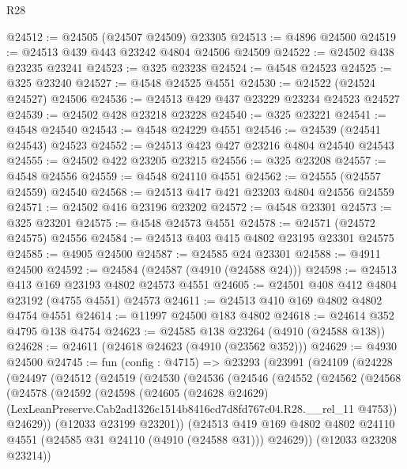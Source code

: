 \begin{lexlean}{R28}
\begin{coremodule}
@24512 := @24505 (@24507 @24509) @23305
@24513 := @4896 @24500
@24519 := @24513 @439 @443 @23242 @4804 @24506 @24509
@24522 := @24502 @438 @23235 @23241
@24523 := @325 @23238
@24524 := @4548 @24523
@24525 := @325 @23240
@24527 := @4548 @24525 @4551
@24530 := @24522 (@24524 @24527) @24506
@24536 := @24513 @429 @437 @23229 @23234 @24523 @24527
@24539 := @24502 @428 @23218 @23228
@24540 := @325 @23221
@24541 := @4548 @24540
@24543 := @4548 @24229 @4551
@24546 := @24539 (@24541 @24543) @24523
@24552 := @24513 @423 @427 @23216 @4804 @24540 @24543
@24555 := @24502 @422 @23205 @23215
@24556 := @325 @23208
@24557 := @4548 @24556
@24559 := @4548 @24110 @4551
@24562 := @24555 (@24557 @24559) @24540
@24568 := @24513 @417 @421 @23203 @4804 @24556 @24559
@24571 := @24502 @416 @23196 @23202
@24572 := @4548 @23301
@24573 := @325 @23201
@24575 := @4548 @24573 @4551
@24578 := @24571 (@24572 @24575) @24556
@24584 := @24513 @403 @415 @4802 @23195 @23301 @24575
@24585 := @4905 @24500
@24587 := @24585 @24 @23301
@24588 := @4911 @24500
@24592 := @24584 (@24587 (@4910 (@24588 @24)))
@24598 := @24513 @413 @169 @23193 @4802 @24573 @4551
@24605 := @24501 @408 @412 @4804 @23192 (@4755 @4551) @24573
@24611 := @24513 @410 @169 @4802 @4802 @4754 @4551
@24614 := @11997 @24500 @183 @4802
@24618 := @24614 @352 @4795 @138 @4754
@24623 := @24585 @138 @23264 (@4910 (@24588 @138))
@24628 := @24611 (@24618 @24623 (@4910 (@23562 @352)))
@24629 := @4930 @24500
@24745 := fun (config : @4715) =>
  @23293
    (@23991
      (@24109
        (@24228
          (@24497
            (@24512
              (@24519
                (@24530
                  (@24536
                    (@24546
                      (@24552
                        (@24562
                          (@24568
                            (@24578
                              (@24592
                                (@24598
                                  (@24605
                                    (@24628 @24629)
                                    (LexLeanPreserve.Cab2ad1326c1514b8416cd7d8fd767c04.R28.__rel_11
                                      @4753))
                                  @24629))
                              (@12033 @23199 @23201))
                            (@24513
                              @419
                              @169
                              @4802
                              @4802
                              @24110
                              @4551
                              (@24585 @31 @24110 (@4910 (@24588 @31)))
                              @24629))
                          (@12033 @23208 @23214))

\end{coremodule}
\end{lexlean}
